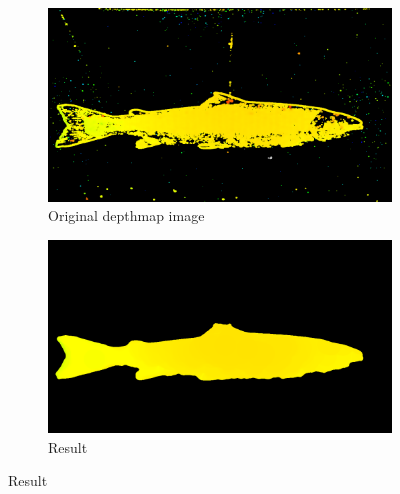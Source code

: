 \begin{figure}[H]
    \begin{subfigure}{0.48\textwidth}
        \includegraphics[width=\linewidth]{images/implementation/algorithm_test/original_63}
        \caption{Original depthmap image} 
        \label{fig:original_depthmap_63}
    \end{subfigure}\hspace*{\fill}
    \begin{subfigure}{0.48\textwidth}
        \includegraphics[width=\linewidth]{images/implementation/algorithm_test/median_filter_63}
        \caption{Result} 
        \label{fig:result_63}
    \end{subfigure}
    

\end{figure}
